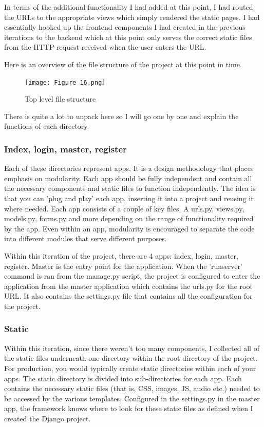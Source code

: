 \documentclass{article}
\begin{document}
In terms of the additional functionality I had added at this point, I had routed the URLs to the appropriate views which simply rendered the static pages. I had essentially hooked up the frontend components I had created in the previous iterations to the backend which at this point only serves the correct static files from the HTTP request received when the user enters the URL. 

Here is an overview of the file structure of the project at this point in time. 

\begin{figure}[H] 
  \centering
  \texttt{[image: Figure 16.png]}
  \caption{Top level file structure}
\end{figure}

There is quite a lot to unpack here so I will go one by one and explain the functions of each directory. 

\subsubsection{Index, login, master, register}

Each of these directories represent apps. It is a design methodology that places emphasis on modularity. Each app should be fully independent and contain all the necessary components and static files to function independently. The idea is that you can 'plug and play' each app, inserting it into a project and reusing it where needed. Each app consists of a couple of key files. A urls.py, views.py, models.py, forms.py and more depending on the range of functionality required by the app. Even within an app, modularity is encouraged to separate the code into different modules that serve different purposes. 

Within this iteration of the project, there are 4 apps: index, login, master, register. Master is the entry point for the application. When the 'runserver' command is ran from the manage.py script, the project is configured to enter the application from the master application which contains the urls.py for the root URL. It also contains the settings.py file that contains all the configuration for the project. 

\subsubsection{Static}

Within this iteration, since there weren't too many components, I collected all of the static files underneath one directory within the root directory of the project. For production, you would typically create static directories within each of your apps. The static directory is divided into sub-directories for each app. Each contains the necessary static files (that is, CSS, images, JS, audio etc.) needed to be accessed by the various templates. Configured in the settings.py in the master app, the framework knows where to look for these static files as defined when I created the Django project. 
\end{document}
